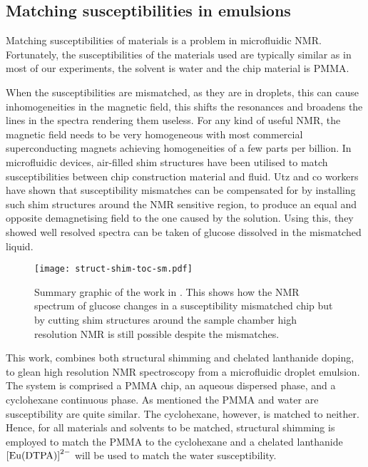 \subsection{Matching susceptibilities in emulsions}


Matching susceptibilities of materials is a problem in microfluidic NMR. Fortunately, the susceptibilities
of the materials used are typically similar as
in most of our experiments, the solvent is water and the chip material is PMMA.

When the susceptibilities are mismatched, as they are in droplets, this can cause inhomogeneities in
the magnetic field, this shifts the resonances and broadens the lines in the spectra rendering them
useless. For any kind of useful NMR, the magnetic field needs to be very homogeneous with most commercial
superconducting magnets achieving homogeneities of a few parts per billion. In microfluidic devices,
air-filled shim structures have been utilised to match susceptibilities between chip construction material
and fluid. Utz and co workers \citep{RN118}
have shown that susceptibility mismatches can be
compensated for by installing such shim structures around the NMR sensitive region, to produce an
equal and opposite demagnetising field to the one caused by the solution. Using this, they showed well
resolved spectra can be taken of glucose dissolved in the mismatched liquid.
\begin{figure}
  \texttt{[image: struct-shim-toc-sm.pdf]}
  \caption{Summary graphic of the work in \citep{RN118}. This shows how the NMR spectrum of glucose
  changes in a susceptibility mismatched chip but by cutting shim structures around the sample chamber high resolution
  NMR is still possible despite the mismatches.}
  \label{ShimStructUtz}
\end{figure}

This work, combines both structural shimming and chelated lanthanide doping, to glean high resolution NMR spectroscopy
from a microfluidic droplet emulsion. The system is comprised a PMMA chip, an aqueous dispersed phase, and a cyclohexane
continuous phase. As mentioned the PMMA and water are susceptibility are quite similar. The cyclohexane, however, is matched to
neither. Hence,  for all materials and solvents to be matched, structural shimming is employed to match the PMMA
to the cyclohexane and a chelated lanthanide $\ce{[Eu(DTPA)]}^{2-}$  will be used to match the water susceptibility.


